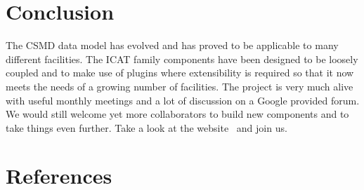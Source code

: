 \documentclass[a4paper]{jpconf}
\begin{document}
\section{Conclusion}
The CSMD data model has evolved and has proved to be applicable to
many different facilities. The ICAT family components have been
designed to be loosely coupled and to make use of plugins where
extensibility is required so that it now meets the needs of a growing
number of facilities. The project is very much alive with useful
monthly meetings and a lot of discussion on a Google provided
forum. We would still welcome yet more collaborators to build new
components and to take things even further. Take a look at the
website~\cite{ref:icatproject} and join us.

\section*{References}


\end{document}
